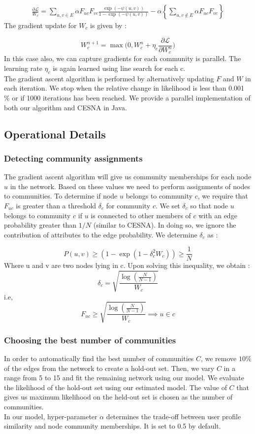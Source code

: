\documentclass[11pt]{article}
\begin{document}
\begin{align*}
\frac{\partial \mathcal{L}}{W_{c}}  = \sum\limits_{u,v \in E}  \alpha F_{uc} F_{vc} \frac{\exp(- \psi(u,v))}{1 - \exp(-\psi(u,v))} -  \alpha \left\lbrace \sum\limits_{u, v \notin E} \alpha F_{uc} F_{vc} \right\rbrace
\end{align*}
The gradient update for $W_c$ is given by : 

\begin{equation} \label{gradw}
W_{c}^{n+1} =  \max \Big(0, W_{c}^n  + \eta_c \frac{\partial \mathcal{L}}{\partial W_{c}^n}\Big) 
\end{equation}
In this case also, we can capture gradients  for each community is parallel.  The learning rate $\eta_c$ is again learned using line search for each c. \\[3pt]
The gradient ascent algorithm is performed by alternatively updating $F$ and $W$ in each iteration.  We stop when the relative change in likelihood is less than 0.001 \% or if 1000 iterations has been reached. We provide a parallel implementation of both our algorithm and CESNA in Java. 

\subsection{Operational Details}
\subsubsection*{Detecting community assignments}
The gradient ascent algorithm will give us community memberships for each node $u$ in the network. Based on these values we need to perform assignments of nodes to communities. To determine if node $u$ belongs to community $c$, we require that $F_{uc}$ is greater than a threshold $\delta_c$ for community $c$. We set $\delta_c$ so that node $u$ belongs to community $c$ if $u$ is connected to other members of $c$ with an edge probability greater than $1/N$ (similar to CESNA). In doing so, we ignore the contribution of attributes to the edge probability. 
We determine $\delta_c$ as : 

\[P(u,v) \geq (1 - \exp(1 - \delta_c^2 W_c)) \geq \frac{1}{N} \]
Where u and v are two nodes lying in c. Upon solving this inequality, we obtain :
$$\delta_c = \sqrt{\frac{\log(\frac{N}{N-1})}{W_c}}$$
i.e,
$$F_{uc} \geq \sqrt{\frac{\log(\frac{N}{N-1})}{W_c}} \implies u \in c$$
\subsubsection*{Choosing the best number of communities}
In order to automatically find the best number of communities $C$, we remove $10 \%$ of the edges from the network to create a hold-out set. Then, we vary $C$ in a range from 5 to 15 and fit the remaining network using our model.  We evaluate the likelihood of the hold-out set using our estimated model. The value of $C$ that gives us maximum likelihood on the held-out set is chosen as the number of communities. \\[5pt]
In our model, hyper-parameter $\alpha$ determines the trade-off between user profile similarity and node community memberships. It is set to 0.5 by default. 
\end{document}
